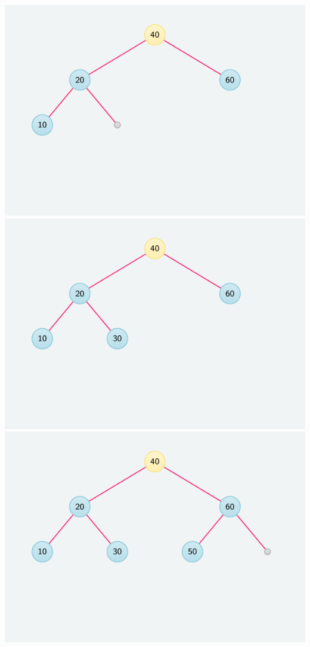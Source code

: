 \documentclass[crop,10pt]{standalone}
\begin{document}
    \includegraphics{frames/tree-03.pdf}
    \includegraphics{frames/tree-04.pdf}
    \includegraphics{frames/tree-05.pdf}
\end{document}
